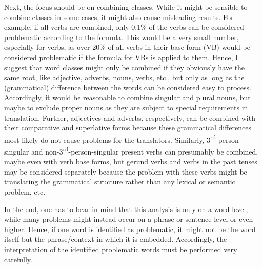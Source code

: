 \textup{Next, the focus should be on combining  classes. While it might be sensible to combine  classes in some cases, it might also cause misleading results. For example, if all verbs are combined, only 0.1\% of the verbs can be considered problematic according to the formula. This would be a very small number, especially for verbs, as over 20\% of all verbs in their base form (VB) would be considered problematic if the formula for VBs is applied to them. Hence, I suggest that word classes might only be combined if they obviously have the same root, like adjective, adverbs, nouns, verbs, etc., but only as long as the (grammatical) difference between the words can be considered easy to process. Accordingly, it would be reasonable to combine singular and plural nouns, but maybe to exclude proper nouns as they are subject to special requirements in translation. Further, adjectives and adverbs, respectively, can be combined with their comparative and superlative forms because these grammatical differences most likely do not cause problems for the translators. Similarly, 3}\textup{\textsuperscript{rd}}\textup{{}-}\textup{person-singular and non-3}\textup{\textsuperscript{rd}}\textup{{}-}\textup{person-singular present verbs can presumably be combined, maybe even with verb base forms, but gerund verbs and verbs in the past tenses may be considered separately because the problem with these verbs might be translating the grammatical structure rather than any lexical or semantic problem, etc.}



{In the end, one has to bear in mind that this analysis is only on a word level, while many problems might instead occur on a phrase or sentence level or even higher.} {Hence, if one word is identified as problematic, it might not be the word itself but the phrase/context in which it is embedded. Accordingly, the interpretation of the identified problematic words must be performed very carefully.}
